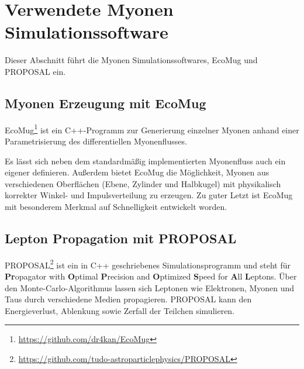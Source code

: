 \chapter{Verwendete Myonen Simulationssoftware}

Dieser Abschnitt führt die Myonen Simulationssoftwares,
EcoMug und PROPOSAL ein.

\section{Myonen Erzeugung mit EcoMug}


EcoMug\footnote{\url{https://github.com/dr4kan/EcoMug}} ist ein C++-Programm 
zur Generierung einzelner Myonen \cite{EcoMug} anhand einer
Parametrisierung des differentiellen Myonenflusses. 

Es lässt sich neben dem standardmäßig implementierten Myonenfluss
auch ein eigener definieren.
Außerdem bietet EcoMug die Möglichkeit, Myonen aus verschiedenen Oberflächen (Ebene, Zylinder und Halbkugel) mit physikalisch korrekter
Winkel- und Impulsverteilung zu erzeugen. 
Zu guter Letzt ist EcoMug mit besonderem Merkmal auf Schnelligkeit entwickelt worden.



\section{Lepton Propagation mit PROPOSAL}

PROPOSAL\footnote{\url{https://github.com/tudo-astroparticlephysics/PROPOSAL}} ist ein in C++ geschriebenes Simulationsprogramm und steht für 
\textbf{Pr}opagator with \textbf{O}ptimal \textbf{P}recision 
and \textbf{O}ptimized \textbf{S}peed for \textbf{A}ll \textbf{L}eptons. 
\cite{proposal, proposal2, proposal3}
Über den Monte-Carlo-Algorithmus lassen sich Leptonen wie
Elektronen, Myonen und Taus durch verschiedene Medien propagieren. 
PROPOSAL kann den Energieverlust, Ablenkung sowie Zerfall der Teilchen simulieren.

